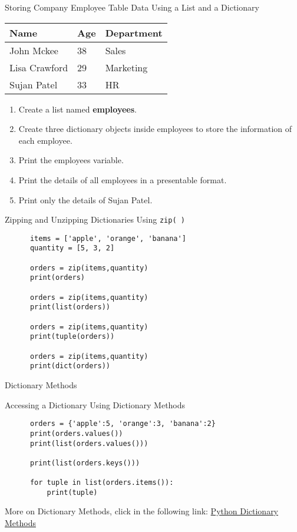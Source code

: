 \begin{frameact}{Storing Company Employee Table Data Using a List and a Dictionary}
  \begin{tabular}{lll}
    Name          & Age & Department \\
    \midrule
    John Mckee    & 38  & Sales      \\
    Lisa Crawford & 29  & Marketing  \\
    Sujan Patel   & 33  & HR        \\
    \bottomrule
  \end{tabular}

  \begin{enumerate} \justifying
  \item Create a list named \textbf{employees}.
  \item Create three dictionary objects inside employees to store the information of each employee.
  \item Print the employees variable.
  \item Print the details of all employees in a presentable format.
  \item Print only the details of Sujan Patel.
  \end{enumerate}
\end{frameact}

\begin{frame}[fragile]{Zipping and Unzipping Dictionaries Using \texttt{zip( )}}
  \begin{exercise}{}
    \begin{lstlisting}
      items = ['apple', 'orange', 'banana']
      quantity = [5, 3, 2]

      orders = zip(items,quantity)
      print(orders)

      orders = zip(items,quantity)
      print(list(orders))

      orders = zip(items,quantity)
      print(tuple(orders))

      orders = zip(items,quantity)
      print(dict(orders))
    \end{lstlisting}
  \end{exercise}
\end{frame}

\begin{frame}[fragile]{Dictionary Methods}
  \begin{exercise}{Accessing a Dictionary Using Dictionary Methods}
    \begin{lstlisting}
      orders = {'apple':5, 'orange':3, 'banana':2}
      print(orders.values())
      print(list(orders.values()))

      print(list(orders.keys()))

      for tuple in list(orders.items()):
          print(tuple)
    \end{lstlisting}
  \end{exercise}

  More on Dictionary Methods, click in the following link: \href{https://www.w3schools.com/python/python_ref_dictionary.asp}{Python Dictionary Methods}      
\end{frame}



